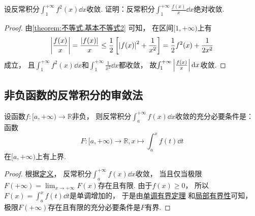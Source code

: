 \begin{example}
设反常积分\(\int_1^{+\infty} f^2(x) \dd{x}\)收敛.
证明：反常积分\(\int_1^{+\infty} \frac{f(x)}{x} \dd{x}\)绝对收敛.
\begin{proof}
由\cref{theorem:不等式.基本不等式2} 可知，
在区间\([1,+\infty)\)上有\[
	\abs{\frac{f(x)}{x}}
	= \frac{\abs{f(x)}}{x}
	\leq \frac{1}{2} \left[
		\abs{f(x)}^2 + \frac{1}{x^2}
	\right]
	= \frac{1}{2} f^2(x) + \frac{1}{2x^2}
\]成立，
且\(\int_1^{+\infty} f^2(x) \dd{x}\)和\(\int_1^{+\infty} \frac{1}{x^2} \dd{x}\)都收敛，
故\(\int_1^{+\infty} \abs{\frac{f(x)}{x}} \dd{x}\)收敛.
\end{proof}
\end{example}

\subsection{非负函数的反常积分的审敛法}
\begin{theorem}\label{theorem:定积分.无穷限反常积分的审敛法引理}
设函数\(f\colon[a,+\infty)\to\mathbb{R}\)非负，
则反常积分\(\int_a^{+\infty} f(x) \dd{x}\)收敛的充分必要条件是：
函数\[
	F\colon[a,+\infty)\to\mathbb{R},
	x \mapsto \int_a^x f(t) \dd{t}
\]在\([a,+\infty)\)上有上界.
\begin{proof}
根据\hyperref[definition:定积分.无穷限的反常积分的定义1]{定义}，
反常积分\(\int_a^{+\infty} f(x) \dd{x}\)收敛，
当且仅当极限\(F(+\infty) = \lim_{x\to+\infty} F(x)\)存在且有限.
由于\(f(x)\geq0\)，
所以\(F(x) = \int_a^x f(t) \dd{t}\)是单调增加的，
于是由\hyperref[theorem:极限.函数的单调有界定理]{单调有界定理}%
和\hyperref[theorem:极限.函数极限的局部有界性]{局部有界性}可知，
极限\(F(+\infty)\)存在且有限的充分必要条件是\(F\)有界.
\end{proof}
\end{theorem}

